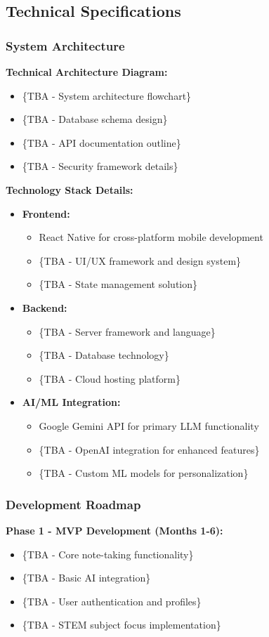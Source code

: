 \subsection{Technical Specifications}
\subsubsection{System Architecture}
\textbf{Technical Architecture Diagram:}
\begin{itemize}
    \item \{TBA - System architecture flowchart\}
    \item \{TBA - Database schema design\}
    \item \{TBA - API documentation outline\}
    \item \{TBA - Security framework details\}
\end{itemize}

\textbf{Technology Stack Details:}
\begin{itemize}
    \item \textbf{Frontend:}
    \begin{itemize}
        \item React Native for cross-platform mobile development
        \item \{TBA - UI/UX framework and design system\}
        \item \{TBA - State management solution\}
    \end{itemize}
    \item \textbf{Backend:}
    \begin{itemize}
        \item \{TBA - Server framework and language\}
        \item \{TBA - Database technology\}
        \item \{TBA - Cloud hosting platform\}
    \end{itemize}
    \item \textbf{AI/ML Integration:}
    \begin{itemize}
        \item Google Gemini API for primary LLM functionality
        \item \{TBA - OpenAI integration for enhanced features\}
        \item \{TBA - Custom ML models for personalization\}
    \end{itemize}
\end{itemize}

\subsubsection{Development Roadmap}
\textbf{Phase 1 - MVP Development (Months 1-6):}
\begin{itemize}
    \item \{TBA - Core note-taking functionality\}
    \item \{TBA - Basic AI integration\}
    \item \{TBA - User authentication and profiles\}
    \item \{TBA - STEM subject focus implementation\}
\end{itemize}

